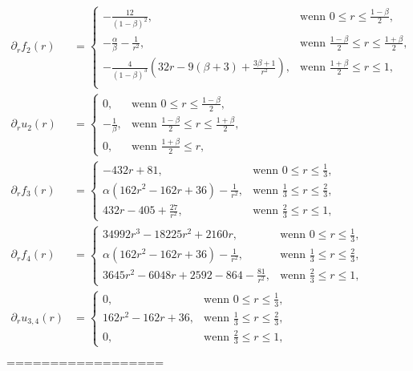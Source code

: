 \begin{align*}
  \partial_r f_2(r) &= 
  \begin{cases}
    -\frac{12}{(1-\beta)^2},&\text{wenn }0\leq r\leq\frac{1-\beta}{2},\\
    -\frac{\alpha}{\beta}-\frac{1}{r^2},&
    \text{wenn } \frac{1-\beta}{2}\leq r\leq \frac{1+\beta}{2},\\
    -\frac{4}{(1-\beta)^3}\left( 32r-9(\beta+3)+\frac{3\beta+1}{r^2} \right),&
    \text{wenn } \frac{1+\beta}{2}\leq r\leq 1,\\
  \end{cases}\\
  \partial_r u_2(r) &= 
  \begin{cases}
    0,&\text{wenn }0\leq r\leq\frac{1-\beta}{2},\\
    -\frac{1}{\beta},&
    \text{wenn } \frac{1-\beta}{2}\leq r\leq \frac{1+\beta}{2},\\
    0,&\text{wenn } \frac{1+\beta}{2}\leq r,
  \end{cases}\\
  \partial_r f_3(r) &=
  \begin{cases}
    - 432r + 81, & \text{wenn } 0\leq r\leq\frac{1}{3},\\
    \alpha\left(162r^2 - 162r + 36\right) - \frac{1}{r^2}, & 
    \text{wenn } \frac{1}{3}\leq r\leq \frac{2}{3},\\
    432r - 405 + \frac{27}{r^2}, & 
    \text{wenn } \frac{2}{3}\leq r\leq 1,
  \end{cases}\\
  \partial_r f_4(r) &=
  \begin{cases}
    34992r^3 - 18225r^2 + 2160r, & \text{wenn } 0\leq r\leq\frac{1}{3},\\
    \alpha\left(162r^2 - 162r + 36\right) - \frac{1}{r^2}, & 
    \text{wenn } \frac{1}{3}\leq r\leq \frac{2}{3},\\
    3645r^2 - 6048r + 2592 - 864 - \frac{81}{r^2}, & 
    \text{wenn } \frac{2}{3}\leq r\leq 1,
  \end{cases}\\
  \partial_r u_{3,4}(r) &=
  \begin{cases}
    0, & \text{wenn } 0\leq r\leq\frac{1}{3},\\
    162r^2 - 162r + 36, & 
    \text{wenn } \frac{1}{3}\leq r\leq \frac{2}{3},\\
    0, & \text{wenn } \frac{2}{3}\leq r\leq 1,
  \end{cases}\\
\end{align*}
==================

